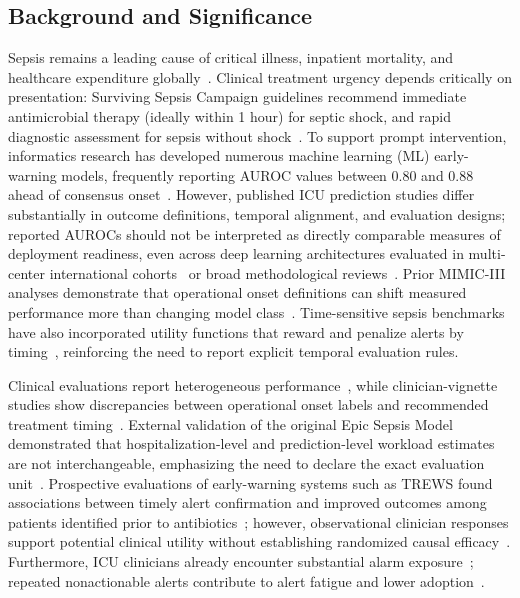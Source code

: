\documentclass[10pt,twocolumn,a4paper]{article}
\begin{document}
\subsection{Background and Significance}
Sepsis remains a leading cause of critical illness, inpatient mortality, and healthcare expenditure globally~\cite{singer2016sepsis,seymour2016assessment}. Clinical treatment urgency depends critically on presentation: Surviving Sepsis Campaign guidelines recommend immediate antimicrobial therapy (ideally within 1 hour) for septic shock, and rapid diagnostic assessment for sepsis without shock~\cite{evans2021surviving,kumar2006duration}. To support prompt intervention, informatics research has developed numerous machine learning (ML) early-warning models, frequently reporting AUROC values between 0.80 and 0.88 ahead of consensus onset~\cite{moor2021early}. However, published ICU prediction studies differ substantially in outcome definitions, temporal alignment, and evaluation designs; reported AUROCs should not be interpreted as directly comparable measures of deployment readiness, even across deep learning architectures evaluated in multi-center international cohorts~\cite{moor2023predicting} or broad methodological reviews~\cite{wang2025methodological}. Prior MIMIC-III analyses demonstrate that operational onset definitions can shift measured performance more than changing model class~\cite{cohen2024subtle}. Time-sensitive sepsis benchmarks have also incorporated utility functions that reward and penalize alerts by timing~\cite{reyna2020early}, reinforcing the need to report explicit temporal evaluation rules.

Clinical evaluations report heterogeneous performance~\cite{wong2021external,adams2022prospective}, while clinician-vignette studies show discrepancies between operational onset labels and recommended treatment timing~\cite{weissman2024sepsis}. External validation of the original Epic Sepsis Model demonstrated that hospitalization-level and prediction-level workload estimates are not interchangeable, emphasizing the need to declare the exact evaluation unit~\cite{wong2021external}. Prospective evaluations of early-warning systems such as TREWS found associations between timely alert confirmation and improved outcomes among patients identified prior to antibiotics~\cite{adams2022prospective,henry2022factors}; however, observational clinician responses support potential clinical utility without establishing randomized causal efficacy~\cite{adams2022prospective}. Furthermore, ICU clinicians already encounter substantial alarm exposure~\cite{drew2014insights}; repeated nonactionable alerts contribute to alert fatigue and lower adoption~\cite{ancker2017effects,paine2016systematic}.
\end{document}
